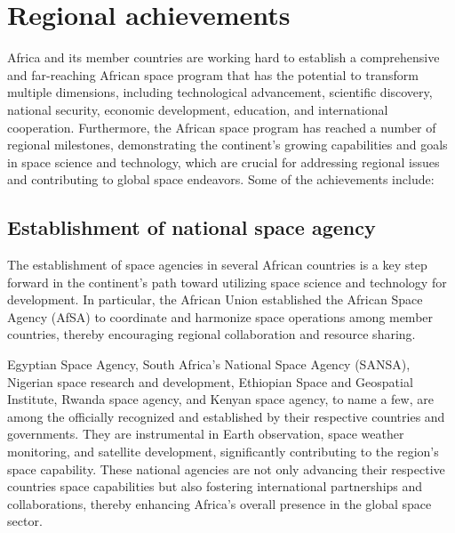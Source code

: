 \documentclass[final,5p,times, twocolumn, sort&compress, sc]{elsarticle}
\begin{document}

\section{Regional achievements}
Africa and its member countries are working hard to establish a comprehensive and far-reaching African space program that has the potential to transform multiple dimensions, including technological advancement, scientific discovery, national security, economic development, education, and international cooperation. Furthermore, the African space program has reached a number of regional milestones, demonstrating the continent's growing capabilities and goals in space science and technology, which are crucial for addressing regional issues and contributing to global space endeavors. Some of the achievements include:
\subsection{ \textbf{Establishment of national space agency}}
	The establishment of space agencies in several African countries is a key step forward in the continent's path toward utilizing space science and technology for development. In particular, the African Union established the African Space Agency (AfSA) to coordinate and harmonize space operations among member countries, thereby encouraging regional collaboration and resource sharing. 
	
	Egyptian Space Agency, South Africa's National Space Agency (SANSA), Nigerian space research and development, Ethiopian Space and Geospatial Institute, Rwanda space agency, and Kenyan space agency, to name a few, are among the officially recognized and established by their respective countries and governments. They are instrumental in Earth observation, space weather monitoring, and satellite development, significantly contributing to the region's space capability.  These national agencies are not only advancing their respective countries space capabilities but also fostering international partnerships and collaborations, thereby enhancing Africa's overall presence in the global space sector.
\end{document}
